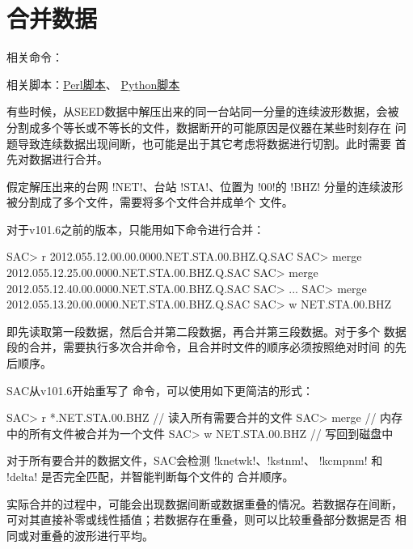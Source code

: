 \section{合并数据}
相关命令：

相关脚本：\hyperref[subsec:merge-in-perl]{Perl脚本}、
          \hyperref[subsec:merge-in-python]{Python脚本}

有些时候，从SEED数据中解压出来的同一台站同一分量的连续波形数据，会被
分割成多个等长或不等长的文件，数据断开的可能原因是仪器在某些时刻存在
问题导致连续数据出现间断，也可能是出于其它考虑将数据进行切割。此时需要
首先对数据进行合并。

假定解压出来的台网 !NET!、台站 !STA!、位置为 !00!的
!BHZ! 分量的连续波形被分割成了多个文件，需要将多个文件合并成单个
文件。

对于v101.6之前的版本，只能用如下命令进行合并：
\begin{SACCode}
SAC> r 2012.055.12.00.00.0000.NET.STA.00.BHZ.Q.SAC
SAC> merge 2012.055.12.25.00.0000.NET.STA.00.BHZ.Q.SAC
SAC> merge 2012.055.12.40.00.0000.NET.STA.00.BHZ.Q.SAC
SAC> ...
SAC> merge 2012.055.13.20.00.0000.NET.STA.00.BHZ.Q.SAC
SAC> w NET.STA.00.BHZ
\end{SACCode}
即先读取第一段数据，然后合并第二段数据，再合并第三段数据。对于多个
数据段的合并，需要执行多次合并命令，且合并时文件的顺序必须按照绝对时间
的先后顺序。

SAC从v101.6开始重写了  命令，可以使用如下更简洁的形式：
\begin{SACCode}
SAC> r *.NET.STA.00.BHZ        // 读入所有需要合并的文件
SAC> merge                     // 内存中的所有文件被合并为一个文件
SAC> w NET.STA.00.BHZ          // 写回到磁盘中
\end{SACCode}

对于所有要合并的数据文件，SAC会检测 !knetwk!、!kstnm!、
!kcmpnm! 和 !delta! 是否完全匹配，并智能判断每个文件的
合并顺序。

实际合并的过程中，可能会出现数据间断或数据重叠的情况。若数据存在间断，
可对其直接补零或线性插值；若数据存在重叠，则可以比较重叠部分数据是否
相同或对重叠的波形进行平均。
